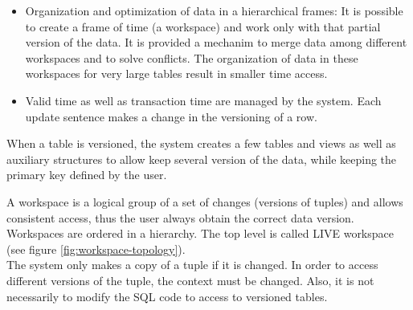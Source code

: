 \begin{itemize}
\item
Organization and optimization of data in a hierarchical frames: It is possible to create a frame of time (a workspace) and work only with that partial version of the data. It is provided a mechanim to merge data among different workspaces and to solve conflicts. The organization of data in these workspaces for very large tables result in smaller time access.
\item
Valid time as well as transaction time are managed by the system. Each update sentence makes a change in the versioning of a row.
\end{itemize}

When a table is versioned, the system creates a few tables and views as well as auxiliary structures to allow keep several version of the data, while keeping the primary key defined by the user.

A workspace is a logical group of a set of changes (versions of tuples) and allows consistent access, thus the user always obtain the correct data version. Workspaces are ordered in a hierarchy. The top level is called LIVE workspace (see figure \ref{fig:workspace-topology}).  \\

The system only makes a copy of a tuple if it is changed. In order to access different versions of the tuple, the context must be changed. Also, it is not necessarily to modify the SQL code to access to versioned tables.\\

